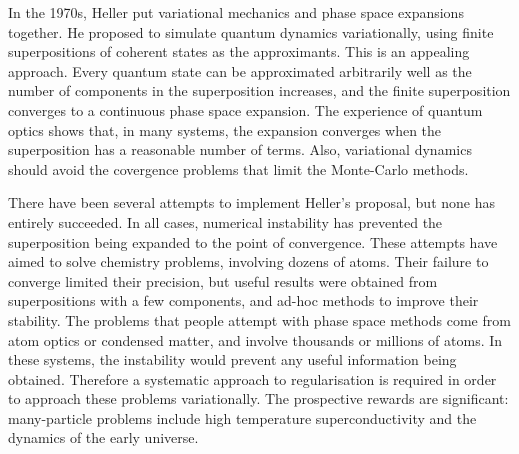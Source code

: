 In the 1970s, Heller put variational mechanics and phase space expansions together.  He proposed to simulate quantum dynamics variationally, using finite superpositions of coherent states as the approximants.  This is an appealing approach.  Every quantum state can be approximated arbitrarily well as the number of components in the superposition increases, and the finite superposition converges to a continuous phase space expansion.  The experience of quantum optics shows that, in many systems, the expansion converges when the superposition has a reasonable number of terms.  Also, variational dynamics should avoid the covergence problems that limit the Monte-Carlo methods.


There have been several attempts to implement Heller's proposal, but none has entirely succeeded.  In all cases, numerical instability has prevented the superposition being expanded to the point of convergence.
These attempts have aimed to solve chemistry problems, involving dozens of atoms.  Their failure to converge limited their precision, but useful results were obtained from superpositions with a few components, and ad-hoc methods to improve their stability.  The problems that people attempt with phase space methods come from atom optics or condensed matter, and involve thousands or millions of atoms.  In these systems, the instability would prevent any useful information being obtained.  Therefore a systematic approach to regularisation is required in order to approach these problems variationally.  The prospective rewards are significant: many-particle problems include high temperature superconductivity and the dynamics of the early universe.


